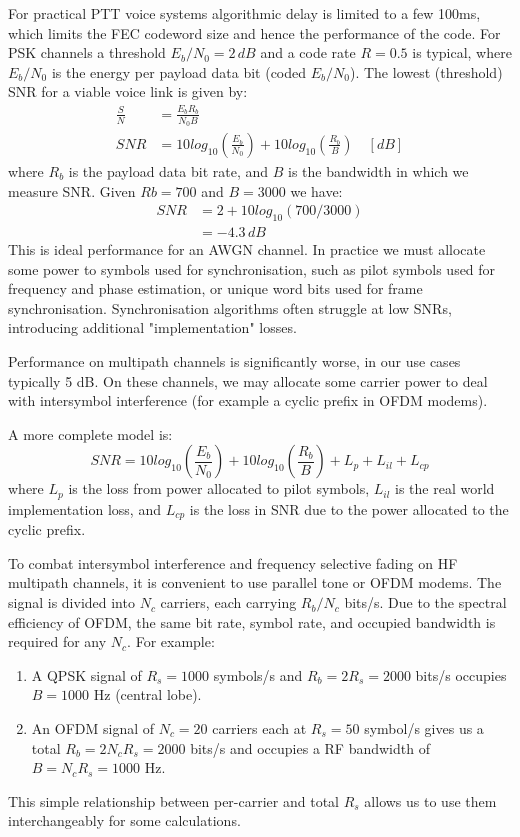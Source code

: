 \documentclass{article}
\begin{document}
For practical PTT voice systems algorithmic delay is limited to a few 100ms, which limits the FEC codeword size and hence the performance of the code.  For PSK channels a threshold $E_b/N_0=2 \, \si{dB}$ and a code rate $R=0.5$ is typical, where $E_b/N_0$ is the energy per payload data bit (coded $E_b/N_0$).  The lowest (threshold) SNR for a viable voice link is given by:
\begin{equation}
\label{eq:snr}
\begin{split}
\frac{S}{N} &= \frac{E_bR_b}{N_0B} \\
SNR &= 10log_{10}\left(\frac{E_b}{N_0}\right) + 10log_{10}\left(\frac{R_b}{B}\right) \quad [\si{dB}]
\end{split}
\end{equation}
where $R_b$ is the payload data bit rate, and $B$ is the bandwidth in which we measure SNR.  Given $Rb=700$ and $B=3000$ we have:
\begin{equation}
\begin{split}
SNR &= 2 + 10log_{10}(700/3000) \\
    &= -4.3 \, \si{dB}
\end{split}
\end{equation}
This is ideal performance for an AWGN channel.  In practice we must allocate some power to symbols used for synchronisation, such as pilot symbols used for frequency and phase estimation, or unique word bits used for frame synchronisation.  Synchronisation algorithms often struggle at low SNRs, introducing additional "implementation" losses.

Performance on multipath channels is significantly worse, in our use cases typically 5 dB.  On these channels, we may allocate some carrier power to deal with intersymbol interference (for example a cyclic prefix in OFDM modems).

A more complete model is:
\begin{equation}
\label{eq:snr_all}
SNR = 10log_{10}\left(\frac{E_b}{N_0}\right) + 10log_{10}\left(\frac{R_b}{B}\right) + L_p + L_{il} + L_{cp}
\end{equation}
where $L_p$ is the loss from power allocated to pilot symbols, $L_{il}$ is the real world implementation loss, and $L_{cp}$ is the loss in SNR due to the power allocated to the cyclic prefix.

To combat intersymbol interference and frequency selective fading on HF multipath channels, it is convenient to use parallel tone or OFDM modems. The signal is divided into $N_c$ carriers, each carrying $R_b/N_c$ bits/s.  Due to the spectral efficiency of OFDM, the same bit rate, symbol rate, and occupied bandwidth is required for any $N_c$.  For example:
\begin{enumerate}
\item A QPSK signal of $R_s=1000$ symbols/s and $R_b=2R_s=2000$ bits/s occupies $B=1000$ Hz (central lobe).
\item An OFDM signal of $N_c=20$ carriers each at $R_s=50$ symbol/s gives us a total $R_b=2N_cR_s=2000$ bits/s and occupies a RF bandwidth of $B=N_cR_s=1000$ Hz.
\end{enumerate}
This simple relationship between per-carrier and total $R_s$ allows us to use them interchangeably for some calculations.
 
\end{document}
